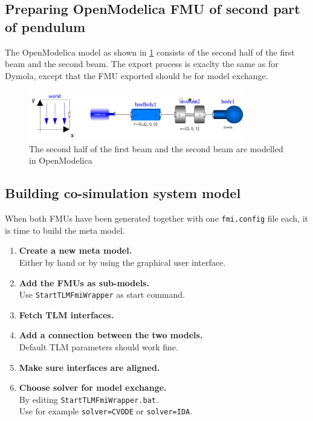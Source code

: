 \documentclass[11pt,a4paper,english]{report}
\begin{document}
\subsection{Preparing OpenModelica FMU of second part of pendulum}
\FloatBarrier
The OpenModelica model as shown in \cref{fig:model_omedit} consists of the second half of the first beam and the second beam.
The export process is exaclty the same as for Dymola, except that the FMU exported should be for model exchange.

\begin{figure}[ht]
\centering
\includegraphics[width=0.85\textwidth]{gfx/model_omedit.png}
\caption{The second half of the first beam and the second beam  are modelled in OpenModelica}
\label{fig:model_omedit}
\end{figure}

\FloatBarrier
\subsection{Building co-simulation system model}

When both FMUs have been generated together with one \texttt{fmi.config} file each, it is time to build the meta model.
\begin{enumerate}
\item \textbf{Create a new meta model.}\\
             Either by hand or by using the graphical user interface.
\item \textbf{Add the FMUs as sub-models.}\\
              Use \texttt{StartTLMFmiWrapper} as start command.
\item \textbf{Fetch TLM interfaces.}
\item \textbf{Add a connection between the two models.}\\
              Default TLM parameters should work fine.
\item \textbf{Make sure interfaces are aligned.}
\item \textbf{Choose solver for model exchange.}\\
              By editing \texttt{StartTLMFmiWrapper.bat}.\\
              Use for example \texttt{solver=CVODE} or \texttt{solver=IDA}.
\end{enumerate}
\end{document}
